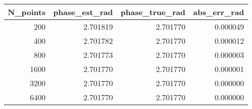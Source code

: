 \begin{tabular}{rrrr}
\toprule
N_points & phase_est_rad & phase_true_rad & abs_err_rad \\
\midrule
200 & 2.701819 & 2.701770 & 0.000049 \\
400 & 2.701782 & 2.701770 & 0.000012 \\
800 & 2.701773 & 2.701770 & 0.000003 \\
1600 & 2.701770 & 2.701770 & 0.000001 \\
3200 & 2.701770 & 2.701770 & 0.000000 \\
6400 & 2.701770 & 2.701770 & 0.000000 \\
\bottomrule
\end{tabular}
